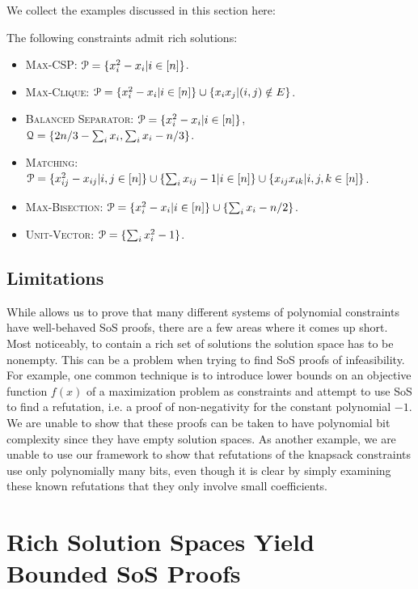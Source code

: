 \documentclass[a4paper,UKenglish]{lipics-v2016}
\begin{document}
We collect the examples discussed in this section here:
\begin{corollary}\label{cor:examples}
The following constraints admit rich solutions:
\begin{itemize}
\item \textsc{Max-CSP}: $\mathcal P = \{x_i^2 - x_i | i \in [n]\}$. 
\item \textsc{Max-Clique}: $\mathcal P = \{x_i^2 - x_i | i \in [n]\} \cup \{x_ix_j | (i,j) \notin E\}$.
\item \textsc{Balanced Separator}: $\mathcal P = \{x_i^2 - x_i | i \in [n]\}$, $\mathcal Q = \{2n/3 - \sum_i x_i, \sum_i x_i - n/3\}$.
\item \textsc{Matching}: $\mathcal P = \{x_{ij}^2 - x_{ij} | i,j \in [n]\} \cup \{\sum_i x_{ij} - 1 | i \in [n]\} \cup \{x_{ij}x_{ik} | i,j,k \in [n]\}$.
\item \textsc{Max-Bisection}: $\mathcal P = \{x_i^2 - x_i | i \in [n]\} \cup \{\sum_i x_i - n/2\}$.
\item \textsc{Unit-Vector}: $\mathcal P = \{\sum_i x_i^2 - 1\}$.
\end{itemize}
\end{corollary}

\subsection{Limitations}
While  allows us to prove that many different systems of polynomial constraints have well-behaved SoS proofs, there are a few areas where it comes up short. Most noticeably, to contain a rich set of solutions the solution space has to be nonempty. This can be a problem when trying to find SoS proofs of infeasibility. For example, one common technique is to introduce lower bounds on an objective function $f(x)$ of a maximization problem as constraints and attempt to use SoS to find a refutation, i.e. a proof of non-negativity for the constant polynomial $-1$. We are unable to show that these proofs can be taken to have polynomial bit complexity since they have empty solution spaces. As another example, we are unable to use our framework to show that refutations of the knapsack constraints use only polynomially many bits, even though it is clear by simply examining these known refutations that they only involve small coefficients. 

\section{Rich Solution Spaces Yield Bounded SoS Proofs}
\label{sec:main}
\end{document}
